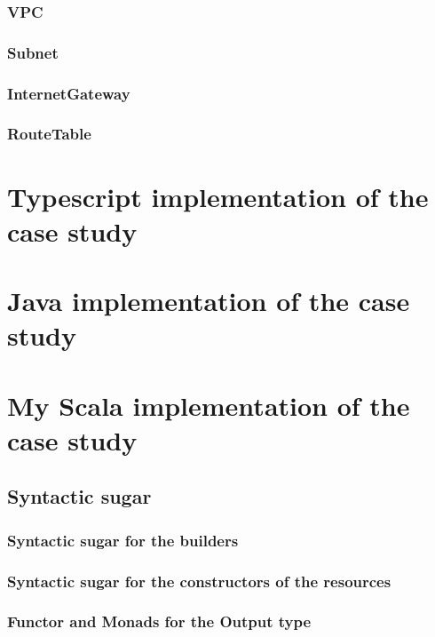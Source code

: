 \subsubsection{VPC}

\subsubsection{Subnet}

\subsubsection{InternetGateway}

\subsubsection{RouteTable}

\section{Typescript implementation of the case study}

\section{Java implementation of the case study}

\section{My Scala implementation of the case study}

\subsection{Syntactic sugar}

\subsubsection{Syntactic sugar for the builders}

\subsubsection{Syntactic sugar for the constructors of the resources}

\subsubsection{Functor and Monads for the Output type}


